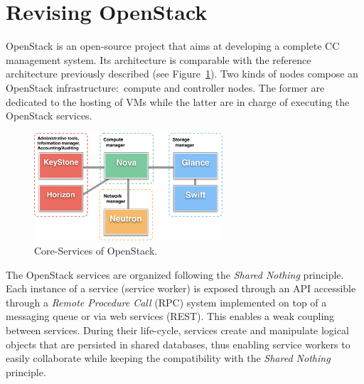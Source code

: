\section{Revising OpenStack\label{sec:leveraging-openstack}}

OpenStack \cite{openstack} is an open-source project that aims at developing a complete CC management system. Its architecture is comparable with the
reference architecture previously described (see Figure~\ref{fig:openstack}). Two kinds of nodes compose an OpenStack infrastructure:~compute and
controller nodes. The former are dedicated to the hosting of VMs while the latter are in charge of executing the OpenStack services.

\begin{figure}[htbp]
        \centering
        \includegraphics[width=7cm]{figures/OpenStack_architecture.pdf}
        \caption{Core-Services of OpenStack.}
        \label{fig:openstack}
\end{figure}


The OpenStack services are organized following the \textit{Shared Nothing} principle. Each instance of a service (\ie service worker) is exposed
through an API accessible through a \textit{Remote Procedure Call} (RPC) system implemented on top of a messaging queue or via web services
(REST). This enables a weak coupling between services. During their life-cycle, services create and manipulate logical objects that are persisted in
shared databases, thus enabling service workers to easily collaborate while keeping the compatibility with the \textit{Shared Nothing} principle.
 

